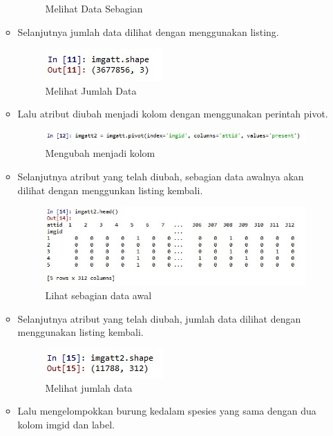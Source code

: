 \begin{enumerate}
\begin{itemize}
\begin{figure}[!hbtp]
			\caption{Melihat Data Sebagian}
			\label{contoh}
			\end{figure}
		\item Selanjutnya jumlah data dilihat dengan menggunakan listing.
			\begin{figure}[!hbtp]
			\centering
			\includegraphics[scale=0.5]{figures/k43.jpg}
			\caption{Melihat Jumlah Data}
			\label{contoh}
			\end{figure}
		\item Lalu atribut diubah menjadi kolom dengan menggunakan perintah pivot.
			\begin{figure}[!hbtp]
			\centering
			\includegraphics[scale=0.5]{figures/k44.jpg}
			\caption{Mengubah menjadi kolom}
			\label{contoh}
			\end{figure}
		\item Selanjutnya atribut yang telah diubah, sebagian data awalnya akan dilihat dengan menggunkan listing kembali.
			\begin{figure}[!hbtp]
			\centering
			\includegraphics[scale=0.5]{figures/k45.jpg}
			\caption{Lihat sebagian data awal}
			\label{contoh}
			\end{figure}
		\item Selanjutnya atribut yang telah diubah, jumlah data dilihat dengan menggunakan listing kembali.
			\begin{figure}[!hbtp]
			\centering
			\includegraphics[scale=0.5]{figures/k46.jpg}
			\caption{Melihat jumlah data}
			\label{contoh}
			\end{figure}
		\item Lalu mengelompokkan burung kedalam spesies yang sama dengan dua kolom imgid dan label.

\end{itemize}
\end{enumerate}
